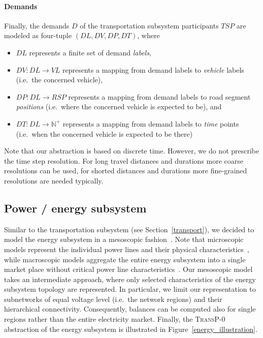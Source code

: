 \paragraph{Demands}
\label{demands}

Finally, the demands $D$ of the transportation subsystem participants $TSP$ are modeled as four-tuple $(DL, DV, DP, DT)$, where
\begin{itemize}
	\item $DL$ represents a finite set of demand \textit{labels},
	\item $DV: DL \rightarrow VL$ represents a mapping from demand labels to \textit{vehicle} labels (i.e.\ the concerned vehicle),
	\item $DP: DL \rightarrow RSP$ represents a mapping from demand labels to road segment \textit{positions} (i.e.\ where the concerned vehicle is expected to be), and
	\item $DT: DL \rightarrow \mathbb{N}^+$ represents a mapping from demand labels to \textit{time} points (i.e.\ when the concerned vehicle is expected to be there)
\end{itemize}
Note that our abstraction is based on discrete time. However, we do not prescribe the time step resolution. For long travel distances and durations more coarse resolutions can be used, for shorted distances and durations more fine-grained resolutions are needed typically.

\subsection{Power / energy subsystem}
\label{energy_system}

Similar to the transportation subsystem (see Section~\ref{transport}), we decided to model the energy subsystem in a mesoscopic fashion~\cite{Hackenberg2012}. Note that microscopic models represent the individual power lines and their physical characteristics~\cite{Dommel1968}, while macroscopic models aggregate the entire energy subsystem into a single market place without critical power line characteristics~\cite{Castronuovo2004}. Our mesoscopic model takes an intermediate approach, where only selected characteristics of the energy subsystem topology are represented. In particular, we limit our representation to subnetworks of equal voltage level (i.e.\ the network regions) and their hierarchical connectivity. Consequently, balances can be computed also for single regions rather than the entire electricity market. Finally, the \textsc{TransP-0} abstraction of the energy subsystem is illustrated in Figure~\ref{energy_illustration}.

